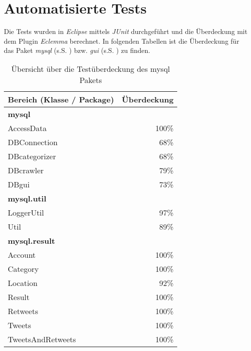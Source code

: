 \section{Automatisierte Tests}
Die Tests wurden in \emph{Eclipse} mittels \emph{JUnit} durchgeführt und die Überdeckung mit dem Plugin \emph{Eclemma} berechnet.
In folgenden Tabellen ist die Überdeckung für das Paket \emph{mysql} (s.S. \pageref{tbl:coverageMysql}) bzw. \emph{gui}
(s.S. \pageref{tbl:coverageGui}) zu finden.
\begin{table}[h]
	\centering
	\begin{tabular} {l||r}
		\label{tbl:coverageMysql}
		Bereich (Klasse / Package) & Überdeckung \\
		\hline
		\hline
		\textbf{mysql} & \\
		\hspace*{3mm}AccessData & 100\% \\
		\hspace*{3mm}DBConnection & 68\% \\
		\hspace*{3mm}DBcategorizer & 68\% \\
		\hspace*{3mm}DBcrawler & 79\% \\
		\hspace*{3mm}DBgui & 73\% \\
		\hline
		\textbf{mysql.util} & \\
		\hspace*{3mm}LoggerUtil & 97\% \\
		\hspace*{3mm}Util & 89\% \\
		\hline
		\textbf{mysql.result} & \\
		\hspace*{3mm}Account & 100\% \\
		\hspace*{3mm}Category & 100\% \\
		\hspace*{3mm}Location & 92\% \\
		\hspace*{3mm}Result & 100\% \\
		\hspace*{3mm}Retweets & 100\% \\
		\hspace*{3mm}Tweets & 100\% \\
		\hspace*{3mm}TweetsAndRetweets & 100\% \\
	\end{tabular}
	\caption{Übersicht über die Testüberdeckung des mysql Pakets}
\end{table}
